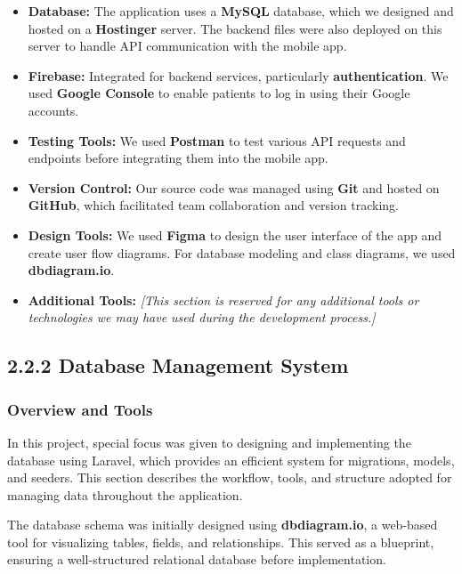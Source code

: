\documentclass[12pt]{report}
\begin{document}
\begin{itemize}
    \item \textbf{Database:} The application uses a \textbf{MySQL} database, which we designed and hosted on a \textbf{Hostinger} server. The backend files were also deployed on this server to handle API communication with the mobile app.

    \item \textbf{Firebase:} Integrated for backend services, particularly \textbf{authentication}. We used \textbf{Google Console} to enable patients to log in using their Google accounts.

    \item \textbf{Testing Tools:} We used \textbf{Postman} to test various API requests and endpoints before integrating them into the mobile app.

    \item \textbf{Version Control:} Our source code was managed using \textbf{Git} and hosted on \textbf{GitHub}, which facilitated team collaboration and version tracking.

    \item \textbf{Design Tools:} We used \textbf{Figma} to design the user interface of the app and create user flow diagrams. For database modeling and class diagrams, we used \textbf{dbdiagram.io}.

    \item \textbf{Additional Tools:} \textit{[This section is reserved for any additional tools or technologies we may have used during the development process.]}
\end{itemize}
\subsection*{2.2.2 Database Management System}

\subsubsection*{Overview and Tools}
In this project, special focus was given to designing and implementing the database using Laravel, which provides an efficient system for migrations, models, and seeders. This section describes the workflow, tools, and structure adopted for managing data throughout the application.

The database schema was initially designed using \textbf{dbdiagram.io}, a web-based tool for visualizing tables, fields, and relationships. This served as a blueprint, ensuring a well-structured relational database before implementation.
\end{document}

